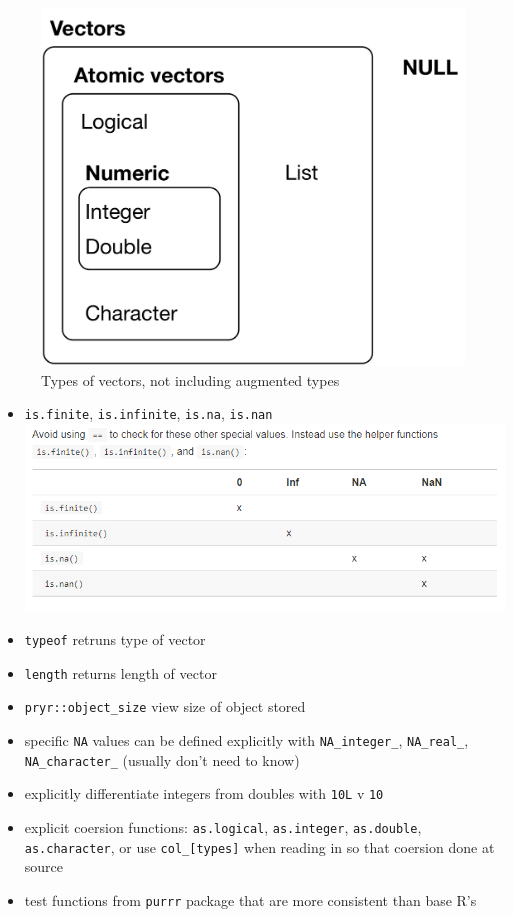 \documentclass[]{book}
\theoremstyle{definition}
\theoremstyle{definition}
\theoremstyle{definition}
\theoremstyle{remark}
\begin{document}
\begin{figure}
\centering
\includegraphics{data-structures-overview.png}
\caption{Types of vectors, not including augmented types}
\end{figure}

\begin{itemize}
\item
  \texttt{is.finite}, \texttt{is.infinite}, \texttt{is.na},
  \texttt{is.nan} \includegraphics{check-special.png}
\item
  \texttt{typeof} retruns type of vector
\item
  \texttt{length} returns length of vector
\item
  \texttt{pryr::object\_size} view size of object stored
\item
  specific \texttt{NA} values can be defined explicitly with
  \texttt{NA\_integer\_}, \texttt{NA\_real\_}, \texttt{NA\_character\_}
  (usually don't need to know)
\item
  explicitly differentiate integers from doubles with \texttt{10L} v
  \texttt{10}
\item
  explicit coersion functions: \texttt{as.logical}, \texttt{as.integer},
  \texttt{as.double}, \texttt{as.character}, or use
  \texttt{col\_{[}types{]}} when reading in so that coersion done at
  source
\item
  test functions from \texttt{purrr} package that are more consistent
  than base R's
\end{itemize}
\end{document}
